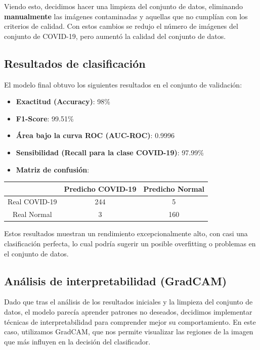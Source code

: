 \documentclass[es]{uc3mreport}
\begin{document}
\begin{report}
    Viendo esto, decidimos hacer una limpieza del conjunto de datos, eliminando \textbf{manualmente} las imágenes contaminadas y aquellas que no cumplían con los criterios de calidad. Con estos cambios se redujo el número de imágenes del conjunto de COVID-19, pero aumentó la calidad del conjunto de datos. 
    
    \subsection{Resultados de clasificación}
    
    El modelo final obtuvo los siguientes resultados en el conjunto de validación:
    
    \begin{itemize}
        \item \textbf{Exactitud (Accuracy)}: 98\%
        \item \textbf{F1-Score}: 99.51\%
        \item \textbf{Área bajo la curva ROC (AUC-ROC)}: 0.9996
        \item \textbf{Sensibilidad (Recall para la clase COVID-19)}: 97.99\%
        \item \textbf{Matriz de confusión}:
    \end{itemize}
    
    \begin{center}
    \begin{tabular}{|c|c|c|}
        \hline
        & Predicho COVID-19 & Predicho Normal \\
        \hline
        Real COVID-19 & 244 & 5 \\
        \hline
        Real Normal & 3 & 160 \\
        \hline
    \end{tabular}
    \end{center}
    
    Estos resultados muestran un rendimiento excepcionalmente alto, con casi una clasificación perfecta, lo cual podría sugerir un posible overfitting o problemas en el conjunto de datos.
    
    \subsection{Análisis de interpretabilidad (GradCAM)}
    Dado que tras el análisis de los resultados iniciales y la limpieza del conjunto de datos, el modelo parecía aprender patrones no deseados, decidimos implementar técnicas de interpretabilidad para comprender mejor su comportamiento. En este caso, utilizamos GradCAM, que nos permite visualizar las regiones de la imagen que más influyen en la decisión del clasificador.


\end{report}
\end{document}

